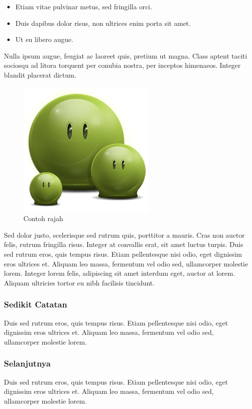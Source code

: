 \begin{itemize}
\item Etiam vitae pulvinar metus, sed fringilla orci.
\item Duis dapibus dolor risus, non ultrices enim porta sit amet.
\item Ut eu libero augue.
\end{itemize}

Nulla ipsum augue, feugiat ac laoreet quis, pretium ut magna. Class aptent taciti sociosqu ad litora torquent per conubia nostra, per inceptos himenaeos. Integer blandit placerat dictum.

\begin{figure}[hbt!]\centering
\includegraphics[width=.5\textwidth]{green}
\caption{Contoh rajah}
\end{figure}

Sed dolor justo, scelerisque sed rutrum quis, porttitor a mauris. Cras non auctor felis, rutrum fringilla risus. Integer at convallis erat, sit amet luctus turpis. Duis sed rutrum eros, quis tempus risus. Etiam pellentesque nisi odio, eget dignissim eros ultrices et. Aliquam leo massa, fermentum vel odio sed, ullamcorper molestie lorem. Integer lorem felis, adipiscing sit amet interdum eget, auctor at lorem. Aliquam ultricies tortor eu nibh facilisis tincidunt.


\subsubsection{Sedikit Catatan}

Duis sed rutrum eros, quis tempus risus. Etiam pellentesque nisi odio, eget dignissim eros ultrices et. Aliquam leo massa, fermentum vel odio sed, ullamcorper molestie lorem.

\subsubsection{Selanjutnya}
Duis sed rutrum eros, quis tempus risus. Etiam pellentesque nisi odio, eget dignissim eros ultrices et. Aliquam leo massa, fermentum vel odio sed, ullamcorper molestie lorem.


